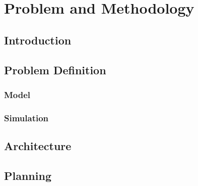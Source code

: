\chapter{Problem and Methodology}\label{chap:chap3}

\section*{}

 

\section{Introduction}

\section{Problem Definition}

\subsection{Model}

\subsection{Simulation}

\section{Architecture}

\section{Planning}
